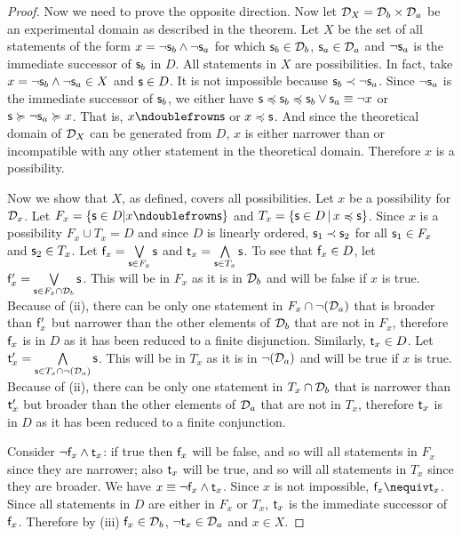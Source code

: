 \documentclass[11pt,letterpaper,fleqn]{memoir} %
\begin{document}
\begin{mathSection}
\begin{proof}
	Now we need to prove the opposite direction. Now let $\edomain_X = \edomain_b \times \edomain_a$ be an experimental domain as described in the theorem. Let $X$ be the set of all statements of the form $x = \NOT \stmt_b \AND \NOT \stmt_a$ for which $\stmt_b \in \edomain_b$, $\stmt_a \in \edomain_a$ and $\NOT \stmt_a$ is the immediate successor of $\stmt_b$ in $D$. All statements in $X$ are possibilities. In fact, take $x = \NOT \stmt_b \AND \NOT \stmt_a \in X$ and $\stmt \in D$. It is not impossible because $\stmt_b \snarrower \NOT \stmt_a$. Since $\NOT \stmt_a$ is the immediate successor of $\stmt_b$, we either have $\stmt \narrower \stmt_b \narrower \stmt_b \OR \stmt_a \equiv \NOT x$ or $\stmt \broader \NOT \stmt_a \broader x$. That is, $x \ncomp \stmt$ or $x \narrower \stmt$. And since the theoretical domain of $\edomain_X$ can be generated from $D$, $x$ is either narrower than or incompatible with any other statement in the theoretical domain. Therefore $x$ is a possibility.
	
	Now we show that $X$, as defined, covers all possibilities. Let $x$ be a possibility for $\edomain_x$. Let $F_x=\{\stmt \in D| x \ncomp \stmt \}$ and $T_x=\{\stmt \in D \, | \, x \narrower \stmt \}$. Since $x$ is a possibility $F_x \cup T_x = D$ and since $D$ is linearly ordered, $\stmt_1 \snarrower \stmt_2$ for all $\stmt_1 \in F_x$ and $\stmt_2 \in T_x$. Let $\stmt[f]_x = \bigOR\limits_{\stmt \in F_x} \stmt$ and $\stmt[t]_x = \bigAND\limits_{\stmt \in T_x} \stmt$. To see that $\stmt[f]_x \in D$, let $\stmt[f]'_x = \bigOR\limits_{\stmt \in F_x\cap\edomain_b} \stmt$. This will be in $F_x$ as it is in $\edomain_b$ and will be false if $x$ is true. Because of (ii), there can be only one statement in $F_x \cap \NOT(\edomain_a)$ that is broader than $\stmt[f]'_x$ but narrower than the other elements of $\edomain_b$ that are not in $F_x$, therefore $\stmt[f]_x$ is in $D$ as it has been reduced to a finite disjunction. Similarly, $\stmt[t]_x \in D$. Let $\stmt[t]'_x = \bigAND\limits_{\stmt \in T_x\cap \NOT(\edomain_a)} \stmt$. This will be in $T_x$ as it is in $\NOT (\edomain_a)$ and will be true if $x$ is true. Because of (ii), there can be only one statement in $T_x \cap \edomain_b$ that is narrower than $\stmt[t]'_x$ but broader than the other elements of $\edomain_a$ that are not in $T_x$, therefore $\stmt[t]_x$ is in $D$ as it has been reduced to a finite conjunction.
	
	Consider $\NOT \stmt[f]_x \AND \stmt[t]_x$: if true then $\stmt[f]_x$ will be false, and so will all statements in $F_x$ since they are narrower; also $\stmt[t]_x$ will be true, and so will all statements in $T_x$ since they are broader. We have $x \equiv \NOT \stmt[f]_x \AND \stmt[t]_x$. Since $x$ is not impossible, $\stmt[f]_x \nequiv \stmt[t]_x$. Since all statements in $D$ are either in $F_x$ or $T_x$, $\stmt[t]_x$ is the immediate successor of $\stmt[f]_x$. Therefore by (iii) $\stmt[f]_x \in \edomain_b$,  $\NOT \stmt[t]_x \in \edomain_a$ and $x \in X$.


\end{proof}
\end{mathSection}
\end{document}
